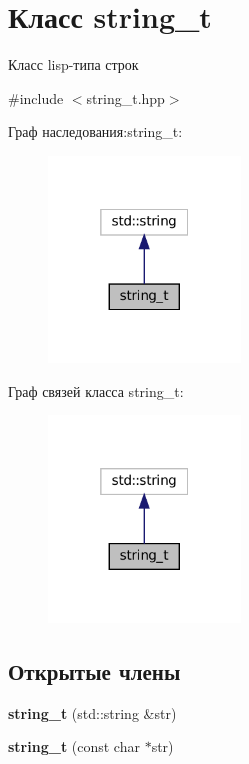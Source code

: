 \hypertarget{classstring__t}{}\section{Класс string\+\_\+t}
\label{classstring__t}


Класс lisp-\/типа строк  




{\ttfamily \#include $<$string\+\_\+t.\+hpp$>$}



Граф наследования\+:string\+\_\+t\+:\nopagebreak
\begin{figure}[H]
\begin{center}
\leavevmode
\includegraphics[width=145pt]{classstring__t__inherit__graph}
\end{center}
\end{figure}


Граф связей класса string\+\_\+t\+:\nopagebreak
\begin{figure}[H]
\begin{center}
\leavevmode
\includegraphics[width=145pt]{classstring__t__coll__graph}
\end{center}
\end{figure}
\subsection*{Открытые члены}
\begin{DoxyCompactItemize}
\item 
\mbox{\label{classstring__t_ae45693d39bbe0865165ff3e8d3f9a523}} 
{\bfseries string\+\_\+t} (std\+::string \&str)
\item 
\mbox{\label{classstring__t_a3e35899571ea6d5a6f69f75650b09f4e}} 
{\bfseries string\+\_\+t} (const char $\ast$str)
\end{DoxyCompactItemize}


